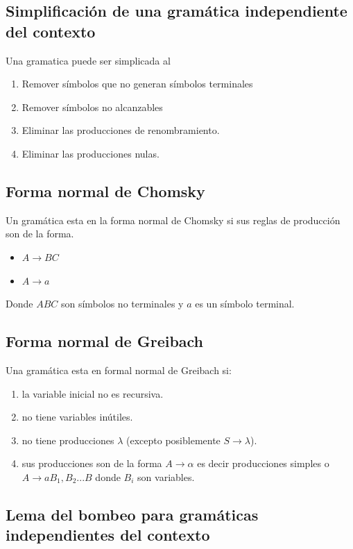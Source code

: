 \documentclass[a4paper,9pt]{extarticle}
\begin{document}
\begin{multicols*}{2}
\subsection{Simplificación de una gramática independiente del contexto}
Una gramatica puede ser simplicada al

\begin{enumerate}
\item Remover símbolos que no generan símbolos terminales
\item Remover símbolos no alcanzables
\item Eliminar las producciones de renombramiento. 
\item Eliminar las producciones nulas.
\end{enumerate}


\subsection{Forma normal de Chomsky}
Un gramática esta en la forma normal de Chomsky si sus reglas de producción son de la forma.

\begin{itemize}
\item $A \longrightarrow BC$
\item $A \longrightarrow a$
\end{itemize}

Donde $ABC$ son símbolos no terminales y $a$ es un símbolo terminal. 

\subsection{Forma normal de Greibach}
Una gramática esta en formal normal de Greibach si:

\begin{enumerate}
\item la variable inicial no es recursiva.
\item no tiene variables inútiles.
\item no tiene producciones $\lambda$ (excepto posiblemente $S \longrightarrow \lambda$).
\item sus producciones son de la forma $A \longrightarrow \alpha$ es decir producciones simples o $A \longrightarrow aB_1, B_2 ... B$ donde $B_i$ son variables.
\end{enumerate}{}

\subsection{Lema del bombeo para gramáticas independientes del contexto}


\end{multicols*}
\end{document}
